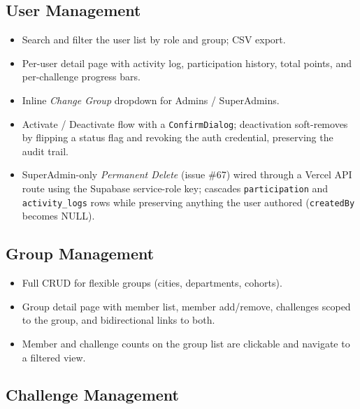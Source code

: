 \documentclass[11pt,letterpaper]{article}
\begin{document}
\subsection{User Management}

\begin{itemize}[noitemsep]
  \item Search and filter the user list by role and group; CSV export.
  \item Per-user detail page with activity log, participation
        history, total points, and per-challenge progress bars.
  \item Inline \emph{Change Group} dropdown for Admins / SuperAdmins.
  \item Activate / Deactivate flow with a \texttt{ConfirmDialog};
        deactivation soft-removes by flipping a status flag and
        revoking the auth credential, preserving the audit trail.
  \item SuperAdmin-only \emph{Permanent Delete} (issue \#67) wired
        through a Vercel API route using the Supabase service-role
        key; cascades \texttt{participation} and \texttt{activity\_logs}
        rows while preserving anything the user authored
        (\texttt{createdBy} becomes NULL).
\end{itemize}

\subsection{Group Management}

\begin{itemize}[noitemsep]
  \item Full CRUD for flexible groups (cities, departments, cohorts).
  \item Group detail page with member list, member add/remove,
        challenges scoped to the group, and bidirectional links to
        both.
  \item Member and challenge counts on the group list are clickable
        and navigate to a filtered view.
\end{itemize}

\subsection{Challenge Management}
\end{document}
